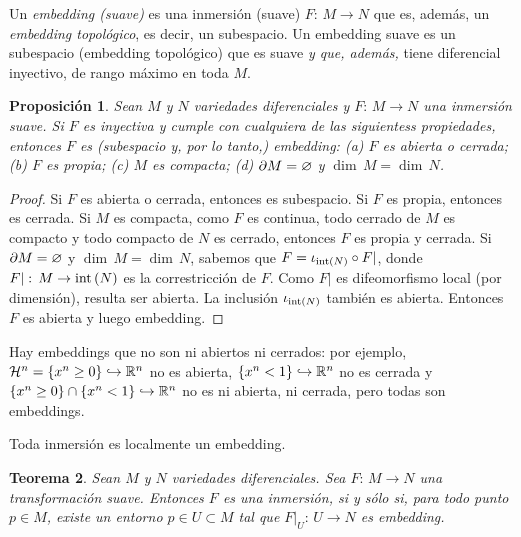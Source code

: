 \theoremstyle{plain}
\newtheorem{teoEmbeddingLocal}{Teorema}[section]
\newtheorem{propoCuandoInmersionEsEmbedding}[teoEmbeddingLocal]%
	{Proposici\'{o}n}

\theoremstyle{remark}
\newtheorem{obsEmbeddingLocal}{Observaci\'{o}n}[section]


Un \emph{embedding (suave)} es una inmersi\'{o}n (suave) $F:\,M\rightarrow N$
que es, adem\'{a}s, un \emph{embedding topol\'{o}gico}, es decir, un
subespacio. Un embedding suave es un subespacio (embedding topol\'{o}gico)
que es suave \emph{y que, adem\'{a}s,} tiene diferencial inyectivo,
de rango m\'{a}ximo en toda $M$.

\begin{propoCuandoInmersionEsEmbedding}\label{thm:cuandoinmersionesembedding}
	Sean $M$ y $N$ variedades diferenciales y $F:\,M\rightarrow N$
	una inmersi\'{o}n suave. Si $F$ es inyectiva y cumple con
	cualquiera de las siguientess propiedades, entonces $F$ es
	(subespacio y, por lo tanto,) embedding: \emph{(a)} $F$ es abierta
	o cerrada; \emph{(b)} $F$ es propia; \emph{(c)} $M$ es compacta;
	\emph{(d)} $\borde[M]=\varnothing$ y $\dim\,M=\dim\,N$.
\end{propoCuandoInmersionEsEmbedding}

\begin{proof}
	Si $F$ es abierta o cerrada, entonces es subespacio. Si $F$ es
	propia, entonces es cerrada. Si $M$ es compacta, como $F$ es
	continua, todo cerrado de $M$ es compacto y todo compacto de $N$
	es cerrado, entonces $F$ es propia y cerrada. Si
	$\borde[M]=\varnothing$ y $\dim\,M=\dim\,N$, sabemos que
	$F=\inc[\interior{N}]\circ F|$, donde
	$F|:\,M\rightarrow\interior{N}$ es la correstricci\'{o}n de $F$.
	Como $F|$ es difeomorfismo local (por dimensi\'{o}n), resulta ser
	abierta. La inclusi\'{o}n $\inc[\interior{N}]$ tambi\'{e}n es
	abierta. Entonces $F$ es abierta y luego embedding.
\end{proof}

Hay embeddings que no son ni abiertos ni cerrados: por ejemplo,
$\hemi[n]=\{x^{n}\geq 0\}\hookrightarrow\bb{R}^{n}$ no es abierta,
$\{x^{n}<1\}\hookrightarrow\bb{R}^{n}$ no es cerrada y
$\{x^{n}\geq 0\}\cap\{x^{n}<1\}\hookrightarrow\bb{R}^{n}$ no es ni
abierta, ni cerrada, pero todas son embeddings.

Toda inmersi\'{o}n es localmente un embedding.

\begin{teoEmbeddingLocal}\label{thm:embeddinglocal}
	Sean $M$ y $N$ variedades diferenciales. Sea $F:\,M\rightarrow N$
	una transformaci\'{o}n suave. Entonces $F$ es una inmersi\'{o}n,
	si y s\'{o}lo si, para todo punto $p\in M$, existe un entorno
	$p\in U\subset M$ tal que $F|_{U}:\,U\rightarrow N$ es embedding.
\end{teoEmbeddingLocal}

